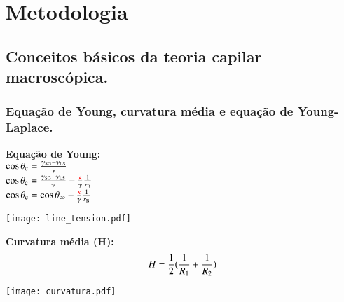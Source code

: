 \documentclass[8pt]{beamer}
\begin{document}
\begin{frame}
\end{frame}

\section{Metodologia}
\subsection{Conceitos básicos da teoria capilar macroscópica.}
\begin{frame}
\frametitle{Equação de Young, curvatura média e equação de Young-Laplace.}
		\begin{minipage}{0.69\textwidth}
			\centering
			\hspace{0.2cm}\textbf{Equação de Young:}\\
				$\cos\theta_{\rm c} = \frac{\gamma_{\rm SG} - \gamma_{\rm LS}}{\gamma}$\\
				\vspace{0.1cm}
				$\cos\theta_{\rm c} = \frac{\gamma_{\rm SG} - \gamma_{\rm LS}}{\gamma} - \frac{\color{red}{\kappa}}{\gamma}\frac{1}{r_{\rm B}}$\\
				\vspace{0.1cm}
				$\cos\theta_{\rm c} = \cos\theta_{\rm \infty} - \frac{\color{red}{\kappa}}{\gamma}\frac{1}{r_{\rm B}}$\\
		\end{minipage}
		\vspace{0.25cm}
		\begin{minipage}{0.3\textwidth}
				\begin{center}
					\texttt{[image: line\_tension.pdf]}\\
				\end{center}
		\end{minipage}
		\begin{minipage}{0.69\textwidth}
			\centering
			\textbf{Curvatura média (H):}
			$$H=\frac{1}{2}(\frac{1}{R_{\rm 1}}+\frac{1}{R_{\rm 2}})$$	
		\end{minipage}
		\begin{minipage}{0.3\textwidth}
				\begin{flushright}
					\texttt{[image: curvatura.pdf]}\\

\end{flushright}
\end{minipage}
\end{frame}
\end{document}
